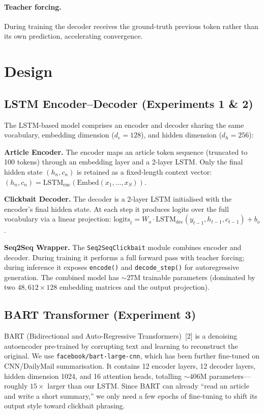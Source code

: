 \documentclass{article}
\begin{document}
\paragraph{Teacher forcing.}
During training the decoder receives the ground-truth previous token rather than its own prediction, accelerating convergence.


\section{Design}

\subsection{LSTM Encoder--Decoder (Experiments 1 \& 2)}

The LSTM-based model comprises an encoder and decoder sharing the same vocabulary, embedding dimension ($d_e = 128$), and hidden dimension ($d_h = 256$):

\textbf{Article Encoder.}
The encoder maps an article token sequence (truncated to 100 tokens) through an embedding layer and a 2-layer LSTM.
Only the final hidden state $(h_n, c_n)$ is retained as a fixed-length context vector:
$(h_n, c_n) = \text{LSTM}_{\text{enc}}(\text{Embed}(x_1, \ldots, x_S))$.

\textbf{Clickbait Decoder.}
The decoder is a 2-layer LSTM initialised with the encoder's final hidden state.
At each step it produces logits over the full vocabulary via a linear projection:
$\text{logits}_t = W_o \cdot \text{LSTM}_{\text{dec}}(y_{t-1}, h_{t-1}, c_{t-1}) + b_o$.

\textbf{Seq2Seq Wrapper.}
The \texttt{Seq2SeqClickbait} module combines encoder and decoder.
During training it performs a full forward pass with teacher forcing; during inference it exposes \texttt{encode()} and \texttt{decode\_step()} for autoregressive generation.
The combined model has ${\sim}27$M trainable parameters (dominated by two $48{,}612 \times 128$ embedding matrices and the output projection).

\subsection{BART Transformer (Experiment 3)}

BART (Bidirectional and Auto-Regressive Transformers)~[2] is a denoising autoencoder pre-trained by corrupting text and learning to reconstruct the original.
We use \texttt{facebook/bart-large-cnn}, which has been further fine-tuned on CNN/DailyMail summarisation.
It contains 12 encoder layers, 12 decoder layers, hidden dimension 1024, and 16 attention heads, totalling ${\sim}406$M parameters---roughly $15\times$ larger than our LSTM.
Since BART can already ``read an article and write a short summary,'' we only need a few epochs of fine-tuning to shift its output style toward clickbait phrasing.
\end{document}
